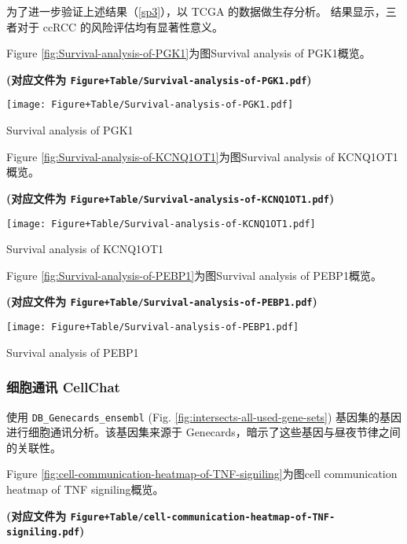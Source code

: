 \documentclass[
]{article}
\begin{document}
为了进一步验证上述结果（\ref{sp3}），以 TCGA 的数据做生存分析。
结果显示，三者对于 ccRCC 的风险评估均有显著性意义。

Figure \ref{fig:Survival-analysis-of-PGK1}为图Survival analysis of PGK1概览。

\textbf{(对应文件为 \texttt{Figure+Table/Survival-analysis-of-PGK1.pdf})}

\def\@captype{figure}
\begin{center}
\texttt{[image: Figure+Table/Survival-analysis-of-PGK1.pdf]}
\caption{Survival analysis of PGK1}\label{fig:Survival-analysis-of-PGK1}
\end{center}

Figure \ref{fig:Survival-analysis-of-KCNQ1OT1}为图Survival analysis of KCNQ1OT1概览。

\textbf{(对应文件为 \texttt{Figure+Table/Survival-analysis-of-KCNQ1OT1.pdf})}

\def\@captype{figure}
\begin{center}
\texttt{[image: Figure+Table/Survival-analysis-of-KCNQ1OT1.pdf]}
\caption{Survival analysis of KCNQ1OT1}\label{fig:Survival-analysis-of-KCNQ1OT1}
\end{center}

Figure \ref{fig:Survival-analysis-of-PEBP1}为图Survival analysis of PEBP1概览。

\textbf{(对应文件为 \texttt{Figure+Table/Survival-analysis-of-PEBP1.pdf})}

\def\@captype{figure}
\begin{center}
\texttt{[image: Figure+Table/Survival-analysis-of-PEBP1.pdf]}
\caption{Survival analysis of PEBP1}\label{fig:Survival-analysis-of-PEBP1}
\end{center}

\hypertarget{ux7ec6ux80deux901aux8baf-cellchat}{%
\subsubsection{细胞通讯 CellChat}\label{ux7ec6ux80deux901aux8baf-cellchat}}

使用 \texttt{DB\_Genecards\_ensembl} (Fig. \ref{fig:intersects-all-used-gene-sets}) 基因集的基因进行细胞通讯分析。该基因集来源于 Genecards，暗示了这些基因与昼夜节律之间的关联性。

Figure \ref{fig:cell-communication-heatmap-of-TNF-signiling}为图cell communication heatmap of TNF signiling概览。

\textbf{(对应文件为 \texttt{Figure+Table/cell-communication-heatmap-of-TNF-signiling.pdf})}
\end{document}
